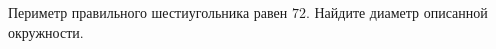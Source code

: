\begin{ex}
	\begin{condition}
		Периметр правильного шестиугольника равен \( 72 \). Найдите диаметр описанной окружности.
	\end{condition}
\end{ex}
